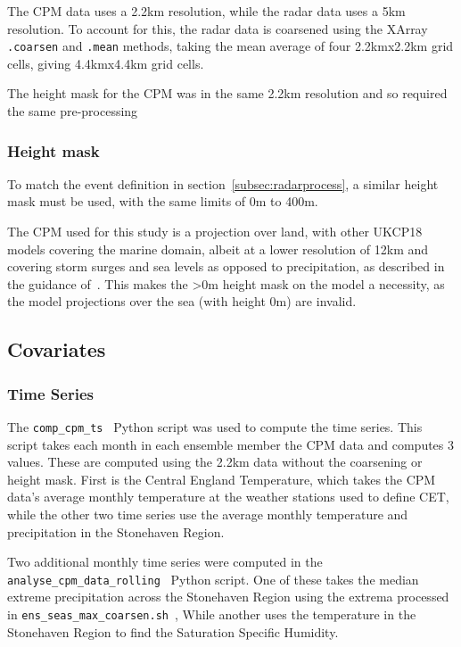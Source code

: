The CPM data uses a 2.2km resolution,
    while the radar data uses a 5km resolution.
To account for this,
    the radar data is coarsened using the XArray \texttt{.coarsen} and \texttt{.mean} methods,
    taking the mean average of four 2.2kmx2.2km grid cells, giving 4.4kmx4.4km grid cells.

The height mask for the CPM was in the same 2.2km resolution
    and so required the same pre-processing

\subsubsection{Height mask}

To match the event definition in section~\ref{subsec:radarprocess},
    a similar height mask must be used,
    with the same limits of 0m to 400m.

The CPM used for this study is a projection over land,
    with other UKCP18 models covering the marine domain,
    albeit at a lower resolution of 12km and covering storm surges and sea levels as opposed to precipitation,
    as described in the guidance of~\cite{model_data}.
This makes the >0m height mask on the model a necessity,
    as the model projections over the sea (with height 0m) are invalid.

\subsection{Covariates}\label{subsec:covfit}

\subsubsection{Time Series}

The \texttt{comp\_cpm\_ts}~\cite{Me_Code} Python script was used to compute the time series.
This script takes each month in each ensemble member the CPM data and computes 3 values.
These are computed using the 2.2km data without the coarsening or height mask.
First is the Central England Temperature,
    which takes the CPM data's average monthly temperature at the weather stations used to define CET,
    while the other two time series use the average monthly temperature and precipitation in the Stonehaven Region.

Two additional monthly time series were computed in the \texttt{analyse\_cpm\_data\_rolling}~\cite{Me_Code} Python script.
One of these takes the median extreme precipitation across the Stonehaven Region
    using the extrema processed in \texttt{ens\_seas\_max\_coarsen.sh}~\cite{Me_Code},
While another uses the temperature in the Stonehaven Region to find the Saturation Specific Humidity.

